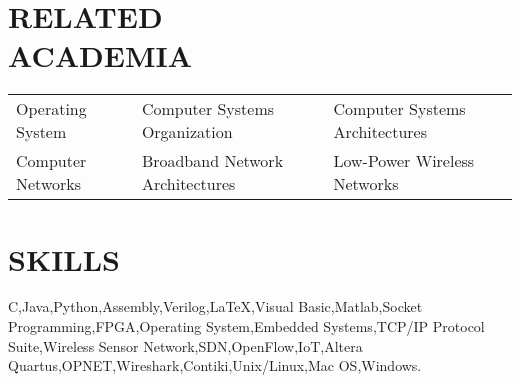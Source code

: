\documentclass[margin,line]{resume}
\begin{document}
\begin{resume}
    \section{\mysidestyle \textbf{\large{R}\small{ELATED\\ACADEMIA}}} 

	\vspace{1mm} %
	\begin{tabular}{@{}p{4cm}p{5.5cm}p{5.5cm}}
	Operating System     &  Computer Systems Organization        &  Computer Systems Architectures\\
	Computer Networks    &  Broadband Network Architectures      &  Low-Power Wireless Networks
	\vspace{4mm}
	\end{tabular}


\sectionline

    \section{\mysidestyle \textbf{\large{S}\small{KILLS}}}

    C,\hspace{2mm}Java,\hspace{2mm}Python,\hspace{2mm}Assembly,\hspace{2mm}Verilog,\hspace{2mm}\LaTeX,\hspace{2mm}Visual Basic,\hspace{2mm}Matlab,\hspace{2mm}Socket Programming,\hspace{2mm}FPGA,\hspace{2mm}Operating System,\hspace{2mm}Embedded Systems,\hspace{2mm}TCP/IP Protocol Suite,\hspace{2mm}Wireless Sensor Network,\hspace{2mm}SDN,\hspace{2mm}OpenFlow,\hspace{2mm}IoT,\hspace{2mm}Altera Quartus,\hspace{2mm}OPNET,\hspace{2mm}Wireshark,\hspace{2mm}Contiki,\hspace{2mm}Unix/Linux,\hspace{2mm}Mac OS,\hspace{2mm}Windows.


\end{resume}
\end{document}

